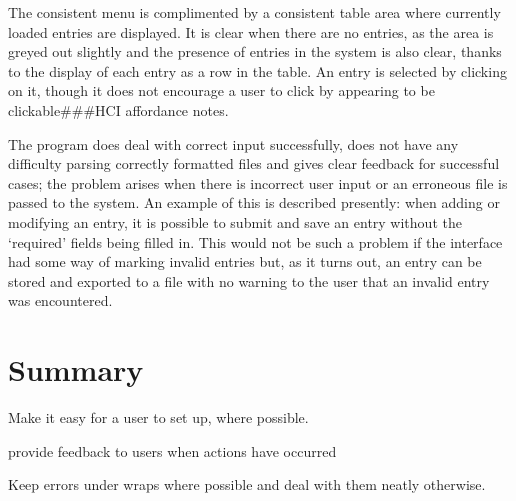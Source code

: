 \documentclass{l4proj}
\newcommand{\revisit}{\#\#\#}
\begin{document}
The consistent menu is complimented by a consistent table area where currently loaded entries are displayed.  It is clear when there are no entries, as the area is greyed out slightly and the presence of entries in the system is also clear, thanks to the display of each entry as a row in the table.  An entry is selected by clicking on it, though it does not encourage a user to click by appearing to be clickable\revisit HCI affordance notes.

The program does deal with correct input successfully, does not have any difficulty parsing correctly formatted files and gives clear feedback for successful cases; the problem arises when there is incorrect user input or an erroneous file is passed to the system.  An example of this is described presently: when adding or modifying an entry, it is possible to submit and save an entry without the `required' fields being filled in.  This would not be such a problem if the interface had some way of marking invalid entries but, as it turns out, an entry can be stored and exported to a file with no warning to the user that an invalid entry was encountered.









\section{Summary}
Make it easy for a user to set up, where possible.

provide feedback to users when actions have occurred 

Keep errors under wraps where possible and deal with them neatly otherwise.
\end{document}
